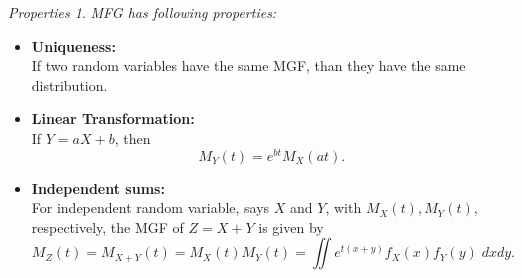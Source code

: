 \documentclass[twoside]{article}
\theoremstyle{definition}
\theoremstyle{remark}
\newtheorem{properties}[theorem]{Properties}
\theoremstyle{remark}
\begin{document}
\begin{properties}{\it MFG has following properties:}\\
  \begin{itemize}
    \item {\bf Uniqueness:}\\
          If two random variables have the same MGF, than they have the same distribution.
    \item {\bf Linear Transformation:}\\
          If $Y = aX + b$, then
          $$
          M_Y(t) = e^{bt}M_X(at).
          $$
    \item {\bf Independent sums:}\\
          For independent random variable, says $X$ and $Y$, with $M_X(t), M_Y(t)$,
          respectively, the MGF of $Z = X + Y$ is given by
          $$
          M_Z(t) = M_{X+Y}(t) = M_X(t)M_Y(t) = \iint e^{t(x+y)}f_X(x)f_Y(y) \;dxdy.
          $$
  \end{itemize}
\end{properties}
\printbibliography

\end{document}
